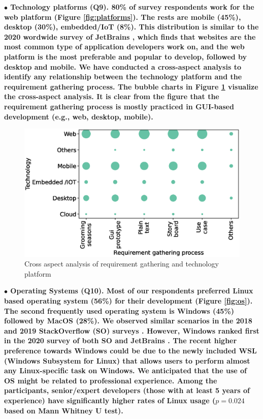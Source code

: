 \nd\bf{$\bullet$ Technology platforms (Q9).} 80\%  of survey respondents work for the web
platform (Figure \ref{fig:platforms}). The rests are mobile (45\%), desktop (30\%), embedded/IoT
(8\%). This distribution is similar to the 2020 wordwide survey of JetBrains \citep{JetBrains2020}, which finds that websites are the most common type of application developers work on, and the web platform is the
most preferable and popular to develop, followed by desktop and mobile. We have conducted a cross-aspect analysis to identify any relationship
between the technology platform and the requirement gathering process. The
bubble charts in Figure \ref{fig:requirement technology cross analysis}
visualize the cross-aspect analysis. It is clear from the figure that the
requirement gathering process is mostly practiced in GUI-based development
(e.g., web, desktop, mobile).

\begin{figure}[t]
\centering
  \includegraphics[scale=0.3]{Figures/Requirement_Technology_Cross_Analysis.eps}
  \caption{Cross aspect analysis of requirement gathering and technology platform}
  \label{fig:requirement technology cross analysis}
\end{figure}

\nd\bf{$\bullet$ Operating Systems (Q10).} Most of our
respondents preferred Linux based operating system (56\%) for their development (Figure \ref{fig:os}). 
The second frequently used operating system is Windows (45\%) followed by MacOS (28\%). We
observed similar scenarios in the 2018 and 2019 StackOverflow (SO) surveys
\citep{StackoverflowSurvey2018, StackoverflowSurvey2019}. However, Windows ranked
first in the 2020 survey of both SO and JetBrains \citep{StackoverflowSurvey2020, JetBrains2020}. The recent higher preference towards Windows could be due to the newly included WSL (Windows Subsystem for Linux) that allows users to perform almost any Linux-specific task on Windows. 
We anticipated that the use of OS might be related to professional experience. Among the participants, senior/expert developers (those with at least 5 years of experience) have significantly higher rates of Linux usage ($p=0.024$ based on Mann Whitney U test).

